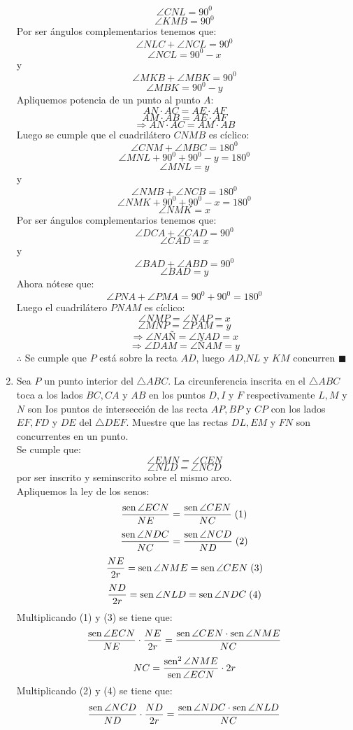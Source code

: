 \documentclass{book}
\newcommand{\sen}{\mathop{\rm sen}\nolimits} %
\begin{document}
\begin{enumerate}
        $$\angle CNL=90^0$$
        $$\angle KMB=90^0$$
        Por ser ángulos complementarios tenemos que:
        $$\angle NLC+\angle NCL=90^0$$
        $$\angle NCL=90^0-x$$
        y
        $$\angle MKB+\angle MBK=90^0$$
        $$\angle MBK=90^0-y$$
        Apliquemos potencia de un punto al punto $A$:
        $$AN\cdot AC=AE\cdot AF$$
        $$AM\cdot AB=AE\cdot AF$$
        $$\Rightarrow AN\cdot AC=AM\cdot AB$$
        Luego se cumple que el cuadrilátero $CNMB$ es cíclico:
        $$\angle CNM+\angle MBC=180^0$$
        $$\angle MNL+90^0+90^0-y=180^0$$
        $$\angle MNL=y$$
        y
        $$\angle NMB+\angle NCB=180^0$$
        $$\angle NMK+90^0+90^0-x=180^0$$
        $$\angle NMK=x$$
        Por ser ángulos complementarios tenemos que:
        $$\angle DCA+\angle CAD=90^0$$
        $$\angle CAD=x$$
        y
        $$\angle BAD+\angle ABD=90^0$$
        $$\angle BAD=y$$
        Ahora nótese que:
        $$\angle PNA+\angle PMA=90^0+90^0=180^0$$
        Luego el cuadrilátero $PNAM$ es cíclico:
        $$\angle NMP=\angle NAP=x$$
        $$\angle MNP=\angle PAM=y$$
        $$\Rightarrow\angle NAÑ=\angle NAD=x$$
        $$\Rightarrow\angle DAM=\angle ÑAM=y$$
        $\therefore$ Se cumple que $P$ está sobre la recta $AD$, luego $AD$,$NL$ y $KM$ concurren $\blacksquare$\\
        \item Sea $P$ un punto interior del $\triangle ABC$. La circunferencia inscrita en el $\triangle ABC$ toca a los lados $BC,CA$ y $AB$ en los puntos $D,I$ y $F$ respectivamente $L,M$ y $N$ son Ios puntos de intersección de las recta $AP,BP$ y $CP$ con los lados $EF,FD$ y $DE$ del $\triangle DEF$. Muestre que las rectas $DL,EM$ y $FN$ son concurrentes en un punto.\\
        Se cumple que:
        $$\angle EMN=\angle CEN$$
        $$\angle NLD=\angle NCD$$
        por ser inscrito y seminscrito sobre el mismo arco.\\
        Apliquemos la ley de los senos:
        $${\sen {\angle ECN}\over NE}={\sen {\angle CEN}\over NC} \; (1)$$
        $${\sen {\angle NDC}\over NC}={\sen {\angle NCD}\over ND} \; (2)$$
        $${NE\over 2r}=\sen {\angle NME}=\sen {\angle CEN}\; (3)$$
        $${ND\over 2r}=\sen {\angle NLD}=\sen {\angle NDC}\; (4)$$
        Multiplicando (1) y (3) se tiene que:
        $${\sen {\angle ECN}\over NE}\cdot{ NE\over 2r}={\sen {\angle CEN}\cdot \sen {\angle NME}\over NC}  $$
        $$NC={\sen^2  {\angle NME}\over\sen {\angle ECN}}\cdot 2r$$
        Multiplicando (2) y (4) se tiene que:
        $${\sen {\angle NCD}\over ND}\cdot{ND\over 2r}={\sen {\angle NDC}\cdot\sen {\angle NLD}\over NC}$$

\end{enumerate}
\end{document}

